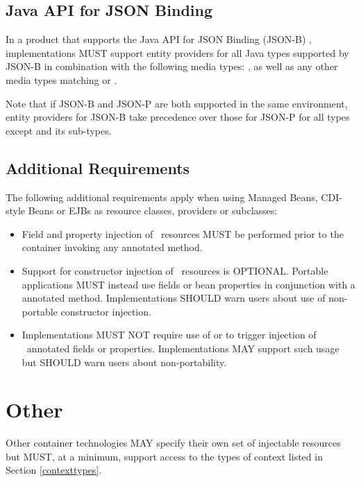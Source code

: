 \subsection{Java API for JSON Binding}
\label{jsonb}
In a product that supports the Java API for JSON Binding (JSON-B) \cite{jsonb}, 
implementations MUST support entity providers for all Java types supported by JSON-B in combination with the following media types: ,  as well as any other media types matching  or . 

Note that if JSON-B and JSON-P are both supported in the same environment, entity providers for JSON-B take precedence over those for JSON-P for all types except  and its sub-types.


\subsection{Additional Requirements}
\label{additional_reqs}

The following additional requirements apply when using Managed Beans, CDI-style Beans or EJBs as resource classes, providers or  subclasses:

\begin{itemize}
\item Field and property injection of \jaxrs\ resources MUST be performed prior to the container invoking any  annotated method.
\item Support for constructor injection of \jaxrs\ resources is OPTIONAL. Portable applications MUST instead use fields or bean properties in conjunction with a  annotated method. Implementations SHOULD warn users about use of non-portable constructor injection.
\item Implementations MUST NOT require use of  or  to trigger injection of \jaxrs\ annotated fields or properties. Implementations MAY support such usage but SHOULD warn users about non-portability.
\end{itemize}

\section{Other}

Other container technologies MAY specify their own set of injectable resources but MUST, at a minimum, support access to the types of context listed in Section \ref{contexttypes}.
